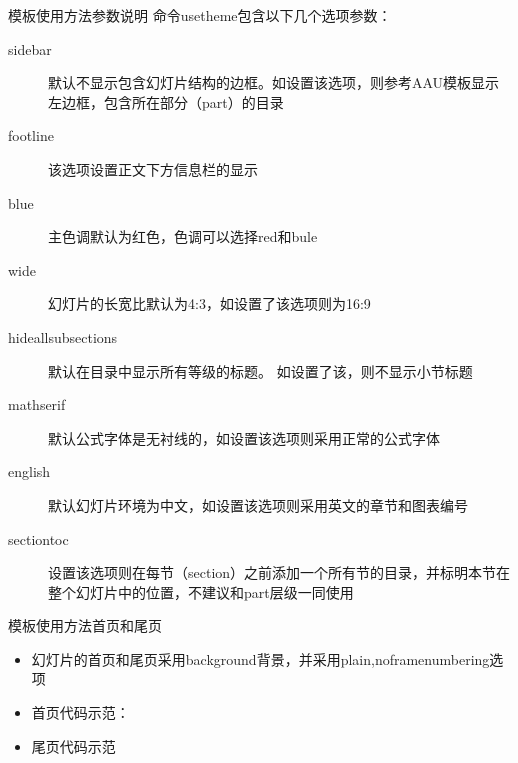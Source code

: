 \documentclass[10pt]{beamer}
\begin{document}
	\begin{frame}{模板使用方法}{参数说明}\label{frame:args}
		命令\alert{usetheme}包含以下几个选项参数：
		\begin{description}
			\item[sidebar] 默认不显示包含幻灯片结构的边框。如设置该选项，则参考AAU模板显示左边框，包含所在部分（part）的目录
			\item[footline] 该选项设置正文下方信息栏的显示
			\item[blue] 主色调默认为红色，色调可以选择red和bule
			\item[wide] 幻灯片的长宽比默认为4:3，如设置了该选项则为16:9
			\item[hideallsubsections] 默认在目录中显示所有等级的标题。
				如设置了该，则不显示小节标题
			\item[mathserif] 默认公式字体是无衬线的，如设置该选项则采用正常的公式字体
			\item[english] 默认幻灯片环境为中文，如设置该选项则采用英文的章节和图表编号
			\item[sectiontoc] 设置该选项则在每节（section）之前添加一个所有节的目录，并标明本节在整个幻灯片中的位置，不建议和\alert{part}层级一同使用
		\end{description}
	\end{frame}

	\begin{frame}{模板使用方法}{首页和尾页}
		\begin{itemize}
			\item 幻灯片的首页和尾页采用background背景，并采用plain,noframenumbering选项
			\item 首页代码示范：
				
			\item 尾页代码示范
				
		\end{itemize}
	\end{frame}

	
\end{document}
